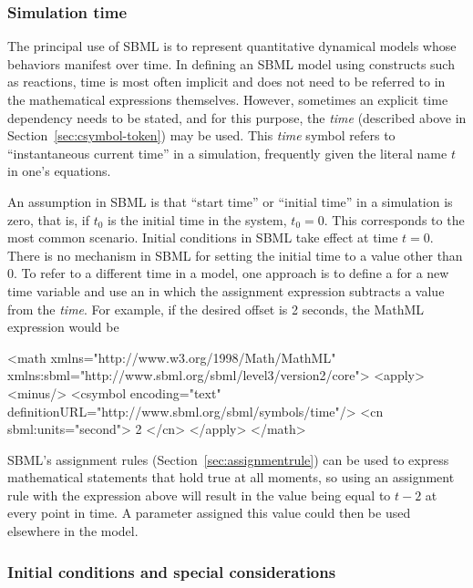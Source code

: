\subsubsection{Simulation time}
\label{sec:meaning-of-time}

The principal use of SBML is to represent quantitative dynamical
models whose behaviors manifest over time.  In defining an
SBML model using constructs such as reactions, time is most often
implicit and does not need to be referred to in the mathematical
expressions themselves.  However, sometimes an explicit time
dependency needs to be stated, and for this purpose, the
\emph{time}  (described above in
Section~\ref{sec:csymbol-token}) may be used.  This \emph{time}
symbol refers to ``instantaneous current time'' in a simulation,
frequently given the literal name $t$ in one's equations.

An assumption in SBML is that ``start time'' or ``initial time''
in a simulation is zero, that is, if $t_0$ is the initial time in
the system, $t_0 = 0$.  This corresponds to the most common
scenario.  Initial conditions in SBML take effect at time $t = 0$.
There is no mechanism in SBML for setting the initial time to a
value other than 0.  To refer to a different time in a model, one
approach is to define a \Parameter for a new time variable and use
an \AssignmentRule in which the assignment expression subtracts a
value from the  \emph{time}.  For example, if the
desired offset is 2 seconds, the MathML expression would be

\begin{example}
<math xmlns="http://www.w3.org/1998/Math/MathML"
      xmlns:sbml="http://www.sbml.org/sbml/level3/version2/core">
    <apply>
        <minus/>
        <csymbol encoding="text" definitionURL="http://www.sbml.org/sbml/symbols/time"/> 
        <cn sbml:units="second"> 2 </cn>
    </apply>
</math>
\end{example}

SBML's assignment rules (Section~\ref{sec:assignmentrule}) can be
used to express mathematical statements that hold true at all
moments, so using an assignment rule with the expression above
will result in the value being equal to $t - 2$ at every point in
time.  A parameter assigned this value could then be used
elsewhere in the model.


\subsubsection{Initial conditions and special considerations}
\label{sec:before-t0}

